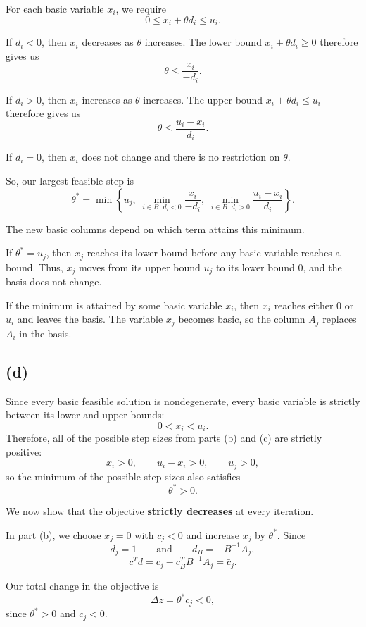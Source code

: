 \documentclass{article}
\begin{document}
For each basic variable $x_i$, we require
\[
0\leq x_i+\theta d_i\leq u_i.
\]

If $d_i<0$, then $x_i$ decreases as $\theta$ increases. The lower bound
$x_i+\theta d_i\geq 0$ therefore gives us
\[
\theta\leq \frac{x_i}{-d_i}.
\]

If $d_i>0$, then $x_i$ increases as $\theta$ increases. The upper bound
$x_i+\theta d_i\leq u_i$ therefore gives us
\[
\theta\leq \frac{u_i-x_i}{d_i}.
\]

If $d_i=0$, then $x_i$ does not change and there is no restriction on
$\theta$.

So, our largest feasible step is
\[
\boxed{
\theta^*
=
\min
\left\{
u_j,\;
\min_{i\in B:\,d_i<0}\frac{x_i}{-d_i},\;
\min_{i\in B:\,d_i>0}\frac{u_i-x_i}{d_i}
\right\}.}
\]

The new basic columns depend on which term attains this minimum.

If $\theta^*=u_j$, then $x_j$ reaches its lower bound before any basic
variable reaches a bound. Thus, $x_j$ moves from its upper bound $u_j$
to its lower bound $0$, and the basis does not change.

If the minimum is attained by some basic variable $x_i$, then $x_i$
reaches either $0$ or $u_i$ and leaves the basis. The variable $x_j$
becomes basic, so the column $A_j$ replaces $A_i$ in the basis.





\vspace{5mm}
\subsection*{(d)}


Since every basic feasible solution is nondegenerate, every basic
variable is strictly between its lower and upper bounds:
\[
0<x_i<u_i.
\]
Therefore, all of the possible step sizes from parts (b) and (c) are
strictly positive: 
\[
x_i>0,\qquad u_i-x_i>0,\qquad u_j>0,
\]
so the minimum of the possible step sizes also satisfies
\[
\boxed{\theta^*>0.}
\]

We now show that the objective \textbf{strictly decreases} at every iteration.

In part (b), we choose $x_j=0$ with $\bar c_j<0$ and increase $x_j$ by
$\theta^*$. Since
\[
d_j=1
\qquad\text{and}\qquad
d_B=-B^{-1}A_j,
\]
\[
c^Td
=
c_j-c_B^TB^{-1}A_j
=
\bar c_j.
\]

Our total change in the objective is
\[
\Delta z=\theta^*\bar c_j<0,
\]
since $\theta^*>0$ and $\bar c_j<0$.
\end{document}
